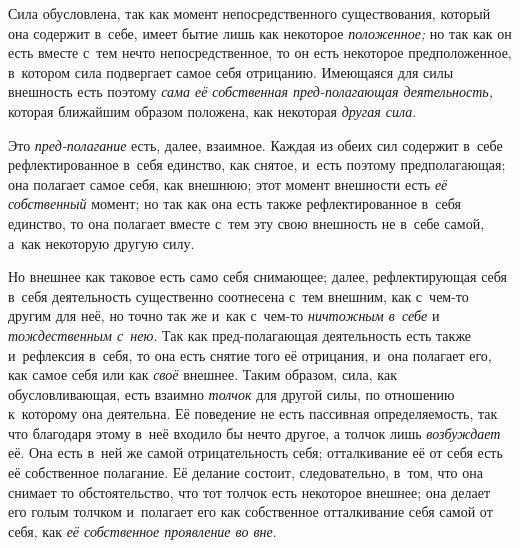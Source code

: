 
Сила обусловлена, так как момент непосредственного существования, который она
содержит в~себе, имеет бытие лишь как некоторое {\em положенное;} но так как он
есть вместе с~тем нечто непосредственное, то он есть некоторое предположенное,
в~котором сила подвергает самое себя отрицанию. Имеющаяся для силы внешность
есть поэтому {\em сама её собственная пред-полагающая деятельность,}
которая ближайшим образом положена, как некоторая {\em другая сила}.

Это {\em пред-полагание} есть, далее, взаимное. Каждая
из обеих сил содержит в~себе рефлектированное в~себя единство, как снятое,
и~есть поэтому предполагающая; она полагает самое себя, как внешнюю; этот
момент внешности есть {\em её собственный} момент; но
так как она есть также рефлектированное в~себя единство, то она полагает
вместе с~тем эту свою внешность не в~себе самой, а~как некоторую другую силу.

Но внешнее как таковое есть само себя снимающее; далее, рефлектирующая себя
в~себя деятельность существенно соотнесена с~тем внешним, как с~чем-то
другим для неё, но точно так же и~как с~чем-то {\em ничтожным в~себе} и
{\em тождественным с~нею}. Так как пред-полагающая
деятельность есть также и~рефлексия в~себя, то она есть снятие того её
отрицания, и~она полагает его, как самое себя или как
{\em своё} внешнее. Таким образом, сила, как
обусловливающая, есть взаимно {\em толчок} для другой
силы, по отношению к~которому она деятельна. Её поведение не есть пассивная
определяемость, так что благодаря этому в~неё входило бы нечто другое, а
толчок лишь {\em возбуждает} её. Она есть в~ней же
самой отрицательность себя; отталкивание её от себя есть её собственное
полагание. Её делание состоит, следовательно, в~том, что она снимает то
обстоятельство, что тот толчок есть некоторое внешнее; она делает его голым
толчком и~полагает его как собственное отталкивание себя самой от себя, как
{\em её собственное проявление во вне}.

